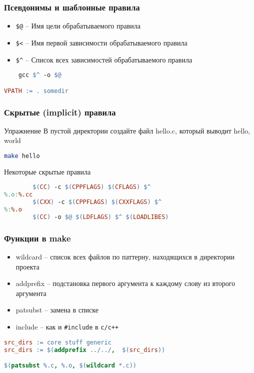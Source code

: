 \begin{frame}[fragile]
	\frametitle{Псевдонимы и шаблонные правила}

	\begin{itemize}
		\item {\tt \$@} -- Имя цели обрабатываемого правила
		\item {\tt \$<} -- Имя первой зависимости обрабатываемого правила 
		\item {\tt \$\^{}} -- Список всех зависимостей обрабатываемого правила
	\end{itemize}

	\begin{lstlisting}[language=make]
%.o: %.c
    gcc $^ -o $@

VPATH := . somedir
	\end{lstlisting}
\end{frame}

\begin{frame}[fragile]
\frametitle{Скрытые (implicit) правила}
\begin{block}{Упражнение}
В пустой директории создайте файл hello.c, который выводит hello, world
\begin{lstlisting}[language=bash]
make hello
\end{lstlisting}
\end{block}
\pause
\begin{center}
Некоторые скрытые правила
\end{center}
\begin{lstlisting}[language=make]
%.o:%.c
        $(CC) -c $(CPPFLAGS) $(CFLAGS) $^
%.o:%.cc
        $(CXX) -c $(CPPFLAGS) $(CXXFLAGS) $^
%:%.o
        $(CC) -o $@ $(LDFLAGS) $^ $(LOADLIBES) 
\end{lstlisting}
\end{frame}
\begin{frame}[fragile]
	\frametitle{Функции в make}

	\begin{itemize}
		\item wildcard -- список всех файлов по паттерну,  находящихся в директории проекта
		\item addprefix -- подстановка первого аргумента к каждому слову из второго аргумента
		\item patsubst -- замена в списке
		\item include -- как и {\tt \#include} в {\tt c/c++}
	\end{itemize}

	\begin{lstlisting}[language=make]
src_dirs := core stuff generic
src_dirs := $(addprefix ../../,  $(src_dirs))

$(patsubst %.c, %.o, $(wildcard *.c))
	\end{lstlisting}

\end{frame}

